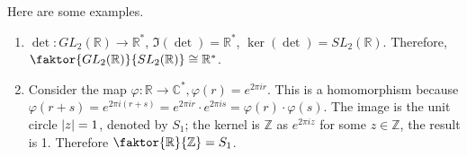 Here are some examples.
\begin{enumerate}
	\item \(\det : GL_2(\mathbb R) \to \mathbb R^*\), \(\Im(\det) = \mathbb R^*\), \(\ker(\det) = SL_2(\mathbb R)\).
	      Therefore, \(\faktor{GL_2(\mathbb R)}{SL_2(\mathbb R)} \cong \mathbb R^*\).
	\item Consider the map \(\varphi: \mathbb R \to \mathbb C^*, \varphi(r) = e^{2\pi i r}\).
	      This is a homomorphism because \(\varphi(r + s) = e^{2\pi i (r + s)} = e^{2 \pi i r}\cdot e^{2 \pi i s} = \varphi(r) \cdot \varphi(s)\).
	      The image is the unit circle \(\abs{z} = 1\), denoted by \(S_1\); the kernel is \(\mathbb Z\) as \(e^{2 \pi i z}\) for some \(z \in \mathbb Z\), the result is 1.
	      Therefore \(\faktor{\mathbb R}{\mathbb Z} = S_1\).
\end{enumerate}

